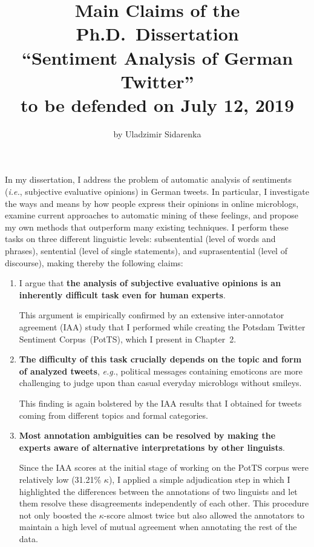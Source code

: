 \documentclass[11pt]{article}
\author{\normalsize{}by Uladzimir Sidarenka}
\title{\normalsize{}Main Claims of the Ph.D.~Dissertation\\[0.4em]
  {\Large{}``Sentiment Analysis of German Twitter''}\\[0.4em]
  to be defended on July 12, 2019\vspace{-4.2ex}}
\date{\vspace{-3ex}}
\newcommand{\ienocomma}{\textit{i.e.}}
\newcommand{\ie}{\ienocomma,}
\newcommand{\eg}{\textit{e.g.},}
\begin{document}
\maketitle

In my dissertation, I address the problem of automatic analysis of
sentiments (\ie{} subjective evaluative opinions) in German tweets.
In particular, I investigate the ways and means by how people express
their opinions in online microblogs, examine current approaches to
automatic mining of these feelings, and propose my own methods that
outperform many existing techniques.  I perform these tasks on three
different linguistic levels: subsentential (level of words and
phrases), sentential (level of single statements), and suprasentential
(level of discourse), making thereby the following claims:

\begin{enumerate}
  \item I argue that \textbf{the analysis of subjective evaluative
    opinions is an inherently difficult task even for human experts}.

    This argument is empirically confirmed by an extensive
    inter-annotator agreement (IAA) study that I performed while
    creating the Potsdam Twitter Sentiment Corpus~(PotTS), which I
    present in Chapter~2.

  \item\textbf{The difficulty of this task crucially depends on the
    topic and form of analyzed tweets}, \eg{} political messages
    containing emoticons are more challenging to judge upon than
    casual everyday microblogs without smileys.

    This finding is again bolstered by the IAA results that I obtained
    for tweets coming from different topics and formal categories.

  \item\textbf{Most annotation ambiguities can be resolved by making
    the experts aware of alternative interpretations by other
    linguists}.

    Since the IAA scores at the initial stage of working on the PotTS
    corpus were relatively low (31.21\% $\kappa$), I applied a simple
    adjudication step in which I highlighted the differences between
    the annotations of two linguists and let them resolve these
    disagreements independently of each other.  This procedure not
    only boosted the $\kappa$-score almost twice but also allowed the
    annotators to maintain a high level of mutual agreement when
    annotating the rest of the data.
\end{enumerate}
\end{document}
